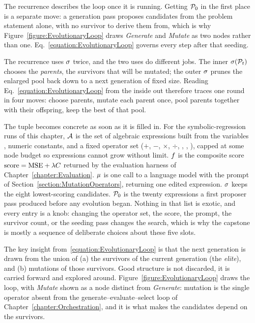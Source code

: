 The recurrence describes the loop once it is running.
Getting $\mathcal{P}_0$ in the first place is a separate move: a generation pass proposes candidates from the problem statement alone, with no survivor to derive them from, which is why Figure~\ref{figure:EvolutionaryLoop} draws \emph{Generate} and \emph{Mutate} as two nodes rather than one.
Eq.~\eqref{equation:EvolutionaryLoop} governs every step after that seeding.

The recurrence uses $\sigma$ twice, and the two uses do different jobs.
The inner $\sigma(\mathcal{P}_t)$ chooses the \emph{parents}, the survivors that will be mutated; the outer $\sigma$ prunes the enlarged pool back down to a next generation of fixed size.
Reading Eq.~\eqref{equation:EvolutionaryLoop} from the inside out therefore traces one round in four moves: choose parents, mutate each parent once, pool parents together with their offspring, keep the best of that pool.

\begin{example}
The tuple becomes concrete as soon as it is filled in.
For the symbolic-regression runs of this chapter, $\mathcal{A}$ is the set of algebraic expressions built from the variables , numeric constants, and a fixed operator set ($+$, $-$, $\times$, $\div$, , , ), capped at some node budget so expressions cannot grow without limit.
$f$ is the composite score $\mathrm{score} = \mathrm{MSE} + \lambda C$ returned by the evaluation harness of Chapter~\ref{chapter:Evaluation}.
$\mu$ is one call to a language model with the prompt of Section~\ref{section:MutationOperators}, returning one edited expression.
$\sigma$ keeps the eight lowest-scoring candidates.
$\mathcal{P}_0$ is the twenty expressions a first proposer pass produced before any evolution began.
Nothing in that list is exotic, and every entry is a knob: changing the operator set, the score, the prompt, the survivor count, or the seeding pass changes the search, which is why the capstone is mostly a sequence of deliberate choices about these five slots.
\end{example}

The key insight from~\eqref{equation:EvolutionaryLoop} is that the next generation is drawn from the union of (a) the survivors of the current generation (the \emph{elite}), and (b) mutations of those survivors.
Good structure is not discarded, it is carried forward and explored around.
Figure~\ref{figure:EvolutionaryLoop} draws the loop, with \emph{Mutate} shown as a node distinct from \emph{Generate}: mutation is the single operator absent from the generate--evaluate--select loop of Chapter~\ref{chapter:Orchestration}, and it is what makes the candidates depend on the survivors.

